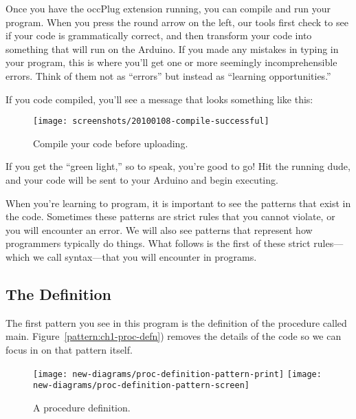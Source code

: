 Once you have the occPlug extension running, you can compile and run your program. When you press the round arrow on the left, our tools first check to see if your code is grammatically correct, and then transform your code into something that will run on the Arduino. If you made any mistakes in typing in your program, this is where you'll get one or more seemingly incomprehensible errors. Think of them not as ``errors'' but instead as ``learning opportunities.''
         
                                
If you code compiled, you'll see a message that looks something like this:

\begin{figure}[ht]
  \begin{center}
    \texttt{[image: screenshots/20100108-compile-successful]}
    \caption{Compile your code before uploading.}
    \label{screenshot:compile-successful}
  \end{center}
\end{figure}

If you get the ``green light,'' so to speak, you're good to go! Hit the running dude, and your code will be sent to your Arduino and begin executing.

\PATTERNS
When you're learning to program, it is important to see the patterns that exist in the code. Sometimes these patterns are strict rules that you cannot violate, or you will encounter an error. We will also see patterns that represent how programmers typically do things. What follows is the first of these strict rules---which we call {\strong syntax}---that you will encounter in \occam programs. 

\subsection{The \PROCedure Definition}
The first pattern you see in this program is the definition of the procedure called {\code main}. Figure~\vref{pattern:ch1-proc-defn}) removes the details of the code so we can focus in on that pattern itself.

\begin{figure}[ht]
  \begin{center}
    	{\texttt{[image: new-diagrams/proc-definition-pattern-print]}}
			{\texttt{[image: new-diagrams/proc-definition-pattern-screen]}}
    \caption{A procedure definition.}
    \label{pattern:ch1-proc-defn}
  \end{center}
\end{figure}  
      
